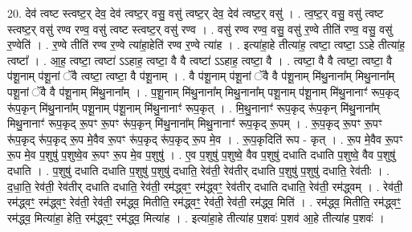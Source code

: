 \documentclass[17pt]{extarticle}
\begin{document}
20. देव॑ त्वष्ट स्त्वष्ट॒र् देव॒ देव॑ त्वष्ट॒र् वसु॒ वसु॑ त्वष्ट॒र् देव॒ देव॑ त्वष्ट॒र् वसु॑ । . त्व॒ष्ट॒र् वसु॒ वसु॑ त्वष्ट स्त्वष्ट॒र् वसु॑ रण्व रण्व॒ वसु॑ त्वष्ट स्त्वष्ट॒र् वसु॑ रण्व । . वसु॑ रण्व रण्व॒ वसु॒ वसु॑ र॒ण्वे तीति॑ रण्व॒ वसु॒ वसु॑ र॒ण्वेति॑ । . र॒ण्वे तीति॑ रण्व र॒ण्वे त्या॑हा॒हेति॑ रण्व र॒ण्वे त्या॑ह । . इत्या॑हा॒हे तीत्या॑ह॒ त्वष्टा॒ त्वष्टा॒ ऽऽहे तीत्या॑ह॒ त्वष्टा᳚ । . आ॒ह॒ त्वष्टा॒ त्वष्टा॑ ऽऽहाह॒ त्वष्टा॒ वै वै त्वष्टा॑ ऽऽहाह॒ त्वष्टा॒ वै । . त्वष्टा॒ वै वै त्वष्टा॒ त्वष्टा॒ वै प॑शू॒नाम् प॑शू॒नां ॅवै त्वष्टा॒ त्वष्टा॒ वै प॑शू॒नाम् । . वै प॑शू॒नाम् प॑शू॒नां ॅवै वै प॑शू॒नाम् मि॑थु॒नाना᳚म् मिथु॒नाना᳚म् पशू॒नां ॅवै वै प॑शू॒नाम् मि॑थु॒नाना᳚म् । . प॒शू॒नाम् मि॑थु॒नाना᳚म् मिथु॒नाना᳚म् पशू॒नाम् प॑शू॒नाम् मि॑थु॒नानाꣳ॑ रूप॒कृद् रू॑प॒कृन् मि॑थु॒नाना᳚म् पशू॒नाम् प॑शू॒नाम् मि॑थु॒नानाꣳ॑ रूप॒कृत् । . मि॒थु॒नानाꣳ॑ रूप॒कृद् रू॑प॒कृन् मि॑थु॒नाना᳚म् मिथु॒नानाꣳ॑ रूप॒कृद् रू॒पꣳ रू॒पꣳ रू॑प॒कृन् मि॑थु॒नाना᳚म् मिथु॒नानाꣳ॑ रूप॒कृद् रू॒पम् । . रू॒प॒कृद् रू॒पꣳ रू॒पꣳ रू॑प॒कृद् रू॑प॒कृद् रू॒प मे॒वैव रू॒पꣳ रू॑प॒कृद् रू॑प॒कृद् रू॒प मे॒व । . रू॒प॒कृदिति॑ रूप - कृत् । . रू॒प मे॒वैव रू॒पꣳ रू॒प मे॒व प॒शुषु॑ प॒शुष्वे॒व रू॒पꣳ रू॒प मे॒व प॒शुषु॑ । . ए॒व प॒शुषु॑ प॒शुष्वे॒ वैव प॒शुषु॑ दधाति दधाति प॒शुष्वे॒ वैव प॒शुषु॑ दधाति । . प॒शुषु॑ दधाति दधाति प॒शुषु॑ प॒शुषु॑ दधाति॒ रेव॑ती॒ रेव॑तीर् दधाति प॒शुषु॑ प॒शुषु॑ दधाति॒ रेव॑तीः । . द॒धा॒ति॒ रेव॑ती॒ रेव॑तीर् दधाति दधाति॒ रेव॑ती॒ रम॑द्ध्वꣳ॒॒ रम॑द्ध्वꣳ॒॒ रेव॑तीर् दधाति दधाति॒ रेव॑ती॒ रम॑द्ध्वम् । . रेव॑ती॒ रम॑द्ध्वꣳ॒॒ रम॑द्ध्वꣳ॒॒ रेव॑ती॒ रेव॑ती॒ रम॑द्ध्व॒ मितीति॒ रम॑द्ध्वꣳ॒॒ रेव॑ती॒ रेव॑ती॒ रम॑द्ध्व॒ मिति॑ । . रम॑द्ध्व॒ मितीति॒ रम॑द्ध्वꣳ॒॒ रम॑द्ध्व॒ मित्या॑हा॒ हेति॒ रम॑द्ध्वꣳ॒॒ रम॑द्ध्व॒ मित्या॑ह । . इत्या॑हा॒हे तीत्या॑ह प॒शवः॑ प॒शव॑ आ॒हे तीत्या॑ह प॒शवः॑ । \newline
\end{document}
